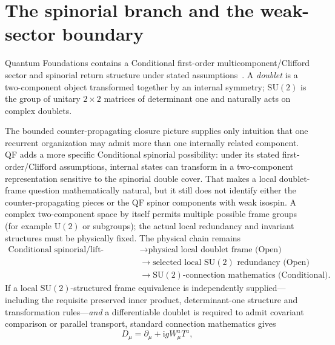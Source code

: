 \documentclass[11pt]{article}
\theoremstyle{definition}
\newcommand{\ii}{\mathrm{i}}
\newcommand{\SUtwo}{\mathrm{SU}(2)}
\begin{document}
\section{The spinorial branch and the weak-sector boundary}
\label{sec:weak_boundary}

Quantum Foundations contains a Conditional first-order multicomponent/Clifford sector and spinorial return structure under stated assumptions~\cite{CmotionQuantumFoundations2026}.  A \emph{doublet} is a two-component object transformed together by an internal symmetry; $\SUtwo$ is the group of unitary $2\times2$ matrices of determinant one and naturally acts on complex doublets.

The bounded counter-propagating closure picture supplies only intuition that one recurrent organization may admit more than one internally related component.  QF adds a more specific Conditional spinorial possibility: under its stated first-order/Clifford assumptions, internal states can transform in a two-component representation sensitive to the spinorial double cover.  That makes a local doublet-frame question mathematically natural, but it still does not identify either the counter-propagating pieces or the QF spinor components with weak isospin.  A complex two-component space by itself permits multiple possible frame groups (for example $\mathrm U(2)$ or subgroups); the actual local redundancy and invariant structures must be physically fixed.  The physical chain remains
\begin{equation}
\begin{aligned}
\text{Conditional spinorial/lift-readable structure}
&\longrightarrow \text{physical local doublet frame (Open)}\\
&\longrightarrow \text{selected local }\SUtwo\text{ redundancy (Open)}\\
&\longrightarrow \SUtwo\text{-connection mathematics (Conditional)}.
\end{aligned}
\label{eq:su2_chain}
\end{equation}
If a local $\SUtwo$-structured frame equivalence is independently supplied---including the requisite preserved inner product, determinant-one structure and transformation rules---\emph{and} a differentiable doublet is required to admit covariant comparison or parallel transport, standard connection mathematics gives
\begin{equation}
 D_\mu=\partial_\mu+\ii gW_\mu^aT^a,
 \label{eq:conditional_su2_connection}
\end{equation}
\end{document}
